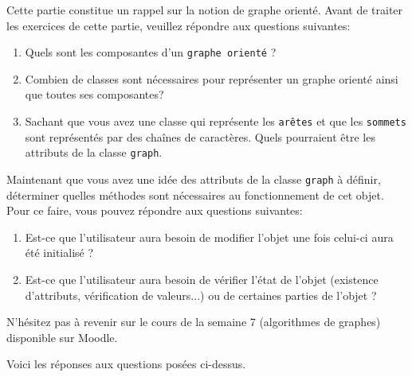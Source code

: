 Cette partie constitue un rappel sur la notion de graphe orienté. Avant de traiter les exercices de cette partie, veuillez répondre aux questions suivantes:
    \begin{enumerate}
        \item Quels sont les composantes d'un \lstinline{graphe orienté} ?
        \item Combien de classes sont nécessaires pour représenter un graphe orienté ainsi que toutes ses composantes?
        \item Sachant que vous avez une classe qui représente les \lstinline{arêtes} et que les \lstinline{sommets} sont représentés par des chaînes de caractères. Quels pourraient être les attributs de la classe \lstinline{graph}.
    \end{enumerate}

Maintenant que vous avez une idée des attributs de la classe \lstinline{graph} à définir, déterminer quelles méthodes sont nécessaires au fonctionnement de cet objet. Pour ce faire, vous pouvez répondre aux questions suivantes:
    \begin{enumerate}
    \item Est-ce que l'utilisateur aura besoin de modifier l'objet une fois celui-ci aura été initialisé ?
    \item Est-ce que l'utilisateur aura besoin de vérifier l'état de l'objet (existence d'attributs, vérification de valeurs...) ou de certaines parties de l'objet ?
    \end{enumerate}

\begin{conseil}
   N'hésitez pas à revenir sur le cours de la semaine 7 (algorithmes de graphes) disponible sur Moodle.
\end{conseil}
    
Voici les réponses aux questions posées ci-dessus. 

